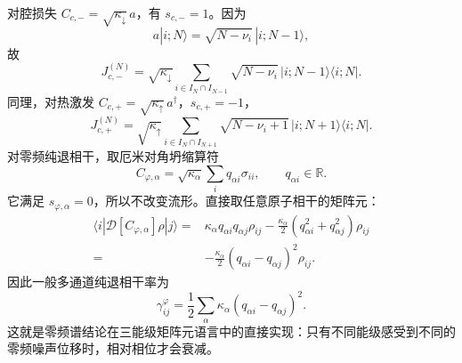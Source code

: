 对腔损失 $C_{c,-}=\sqrt{\kappa_\downarrow}\,a$，有 $s_{c,-}=1$。因为
\[
a|i;N\rangle
=\sqrt{N-\nu_i}\,|i;N-1\rangle,
\]
故
\begin{equation}
J_{c,-}^{(N)}
=\sqrt{\kappa_\downarrow}
\sum_{i\in I_N\cap I_{N-1}}
\sqrt{N-\nu_i}\,
|i;N-1\rangle\langle i;N|.
\label{eq:phys-oqs-three-cavity-jump-down}
\end{equation}
同理，对热激发 $C_{c,+}=\sqrt{\kappa_\uparrow}\,a^\dagger$，$s_{c,+}=-1$，
\begin{equation}
J_{c,+}^{(N)}
=\sqrt{\kappa_\uparrow}
\sum_{i\in I_N\cap I_{N+1}}
\sqrt{N-\nu_i+1}\,
|i;N+1\rangle\langle i;N|.
\label{eq:phys-oqs-three-cavity-jump-up}
\end{equation}
对零频纯退相干，取厄米对角坍缩算符
\begin{equation}
C_{\varphi,\alpha}
=\sqrt{\kappa_\alpha}\sum_iq_{\alpha i}\sigma_{ii},
\qquad q_{\alpha i}\in\mathbb R.
\label{eq:phys-oqs-three-dephasing-collapse}
\end{equation}
它满足 $s_{\varphi,\alpha}=0$，所以不改变流形。直接取任意原子相干的矩阵元：
\begin{align}
\langle i|\mathcal D[C_{\varphi,\alpha}]\rho|j\rangle
={}&\kappa_\alpha q_{\alpha i}q_{\alpha j}\rho_{ij}
-\frac{\kappa_\alpha}{2}
(q_{\alpha i}^2+q_{\alpha j}^2)\rho_{ij}\nonumber\\
={}&-\frac{\kappa_\alpha}{2}
(q_{\alpha i}-q_{\alpha j})^2\rho_{ij}.
\end{align}
因此一般多通道纯退相干率为
\begin{equation}
\gamma_{ij}^{\varphi}
=\frac12\sum_\alpha\kappa_\alpha
(q_{\alpha i}-q_{\alpha j})^2.
\label{eq:phys-oqs-general-pure-dephasing-rate}
\end{equation}
这就是零频谱结论在三能级矩阵元语言中的直接实现：只有不同能级感受到不同的零频噪声位移时，相对相位才会衰减。

